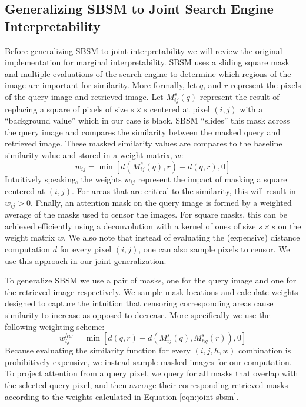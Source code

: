 \documentclass{article} %
\begin{document}
\subsection{Generalizing SBSM to Joint Search Engine Interpretability}
\label{sec:joint-sbsm}

Before generalizing SBSM \citep{sbsm} to joint interpretability we will review the original implementation for marginal interpretability. SBSM uses a sliding square mask and multiple evaluations of the search engine to determine which regions of the image are important for similarity. More formally, let $q$, and $r$ represent the pixels of the query image and retrieved image. Let $M^s_{ij}(q)$ represent the result of replacing a square of pixels of size $s \times s$ centered at pixel $(i,j)$ with a ``background value'' which in our case is black. SBSM ``slides'' this mask across the query image and compares the similarity between the masked query and retrieved image. These masked similarity values are compares to the baseline similarity value and stored in a weight matrix, $w$:
\begin{equation}
    w_{ij} = \min \left[ d\left( M^s_{ij}(q), r\right) - d\left(q, r\right), 0\right]
\end{equation}
Intuitively speaking, the weights $w_{ij}$ represent the impact of masking a square centered at $(i, j)$. For areas that are critical to the similarity, this will result in $w_{ij}>0$. Finally, an attention mask on the query image is formed by a weighted average of the masks used to censor the images. For square masks, this can be achieved efficiently using a deconvolution with a kernel of ones of size $s \times s$ on the weight matrix $w$. We also note that instead of evaluating the (expensive) distance computation $d$ for every pixel $(i,j)$, one can also sample pixels to censor. We use this approach in our joint generalization. 

To generalize SBSM we use a pair of masks, one for the query image and one for the retrieved image respectively. We sample mask locations and calculate weights designed to capture the intuition that censoring corresponding areas cause similarity to increase as opposed to decrease. More specifically we use the following weighting scheme:
\begin{equation}
    \label{eqn:joint-sbsm}
    w_{ij}^{hw} = \min \left[ d\left(q, r\right) - d\left( M^s_{ij}\left(q\right), M^s_{hq}\left(r\right)\right), 0\right]
\end{equation}
Because evaluating the similarity function for every $(i,j,h,w)$ combination is prohibitively expensive, we instead sample masked images for our computation. To project attention from a query pixel, we query for all masks that overlap with the selected query pixel, and then average their corresponding retrieved masks according to the weights calculated in Equation \ref{eqn:joint-sbsm}.
\end{document}
